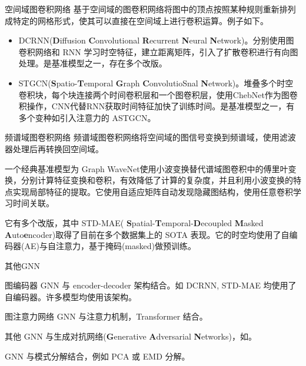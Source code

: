 \documentclass{libs/format}
\begin{document}
\begin{frame}{空间域图卷积网络}
  基于空间域的图卷积网络将图中的顶点按照某种规则重新排列成特定的网格形式，使其可以直接在空间域上进行卷积运算。\cite{T-ZS37}例子如下。

  \begin{itemize}
    \item DCRNN(\textbf{D}iffusion \textbf{C}onvolutional \textbf{R}ecurrent \textbf{N}eural \textbf{N}etwork)\cite{T-40}。分别使用图卷积网络和 RNN 学习时空特征，建立距离矩阵，引入了扩散卷积进行有向图处理。是基准模型之一，存在多个改版。
    \item STGCN(\textbf{S}patio-\textbf{T}emporal \textbf{G}raph \textbf{C}onvolutioSnal \textbf{N}etwork)\cite{T-28}。堆叠多个时空卷积块，每个块连接两个时间卷积层和一个图卷积层，使用ChebNet作为图卷积操作，CNN代替RNN获取时间特征加快了训练时间。是基准模型之一，有多个变种如引入注意力的 ASTGCN\cite{T-81}。
  \end{itemize}
\end{frame}

\begin{frame}{频谱域图卷积网络}
  频谱域图卷积网络将空间域的图信号变换到频谱域，使用滤波器处理后再转换回空间域。

  一个经典基准模型为 Graph WaveNet\cite{T-64}使用小波变换替代谱域图卷积中的傅里叶变换，分别计算特征变换和卷积，有效降低了计算的复杂度，并且利用小波变换的特点实现局部特征的提取。它使用自适应矩阵自动发现隐藏图结构，使用任意卷积学习时间关联。
  
  它有多个改版，其中 STD-MAE( \textbf{S}patial-\textbf{T}emporal-\textbf{D}ecoupled \textbf{M}asked \textbf{A}uto\textbf{e}ncoder)\cite{T-135}取得了目前在多个数据集上的 SOTA 表现。它的时空均使用了自编码器(AE)与自注意力，基于掩码(masked)做预训练。
\end{frame}

\begin{frame}{其他GNN}
  \begin{block}{图编码器}
    GNN 与 encoder-decoder 架构结合。如 DCRNN, STD-MAE 均使用了自编码器。许多模型均使用该架构。
  \end{block}
  \begin{block}{图注意力网络}
    GNN 与注意力机制，Transformer 结合。
  \end{block}
  \begin{block}{其他}
    GNN 与生成对抗网络(\textbf{G}enerative \textbf{A}dversarial \textbf{N}etworks)，如\cite{T-244}。

    GNN 与模式分解结合，例如 PCA 或 EMD 分解\cite{T-247}。
  \end{block}
\end{frame}
\end{document}
